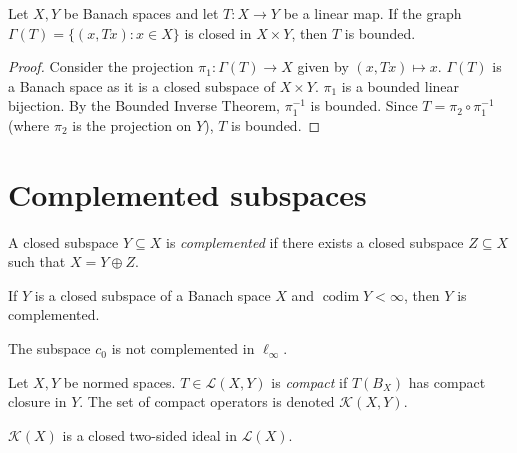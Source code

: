 \begin{theorem}
\label{theorem-closed-graph}
Let $X, Y$ be Banach spaces and let $T : X
\to Y$ be a linear map. If the graph
$\Gamma(T) = \{ (x, Tx) : x \in X \}$ is
closed in $X \times Y$, then $T$ is bounded.
\end{theorem}

\begin{proof}
Consider the projection $\pi_1 : \Gamma(T)
\to X$ given by $(x, Tx) \mapsto x$.
$\Gamma(T)$ is a Banach space as it is a
closed subspace of $X \times Y$. $\pi_1$ is a
bounded linear bijection. By the Bounded
Inverse Theorem, $\pi_1^{-1}$ is bounded.
Since $T = \pi_2 \circ \pi_1^{-1}$ (where
$\pi_2$ is the projection on $Y$), $T$ is
bounded.
\end{proof}

\section{Complemented subspaces}
\label{section-complemented-subspaces}

\begin{definition}
\label{definition-complemented-subspace}
A closed subspace $Y \subseteq X$ is {\it
complemented} if there exists a closed
subspace $Z \subseteq X$ such that $X = Y
\oplus Z$.
\end{definition}

\begin{proposition}
\label{proposition-finite-codim-complemented}
If $Y$ is a closed subspace of a Banach space
$X$ and $\operatorname{codim} Y < \infty$,
then $Y$ is complemented.
\end{proposition}

\begin{theorem}[Phillips]
\label{theorem-c0-not-complemented}
The subspace $c_0$ is not complemented in
$\ell_\infty$.
\end{theorem}


\begin{definition}
\label{definition-compact-operator}
Let $X, Y$ be normed spaces. $T \in \mathcal
L(X,Y)$ is {\it compact} if $T(B_X)$ has
compact closure in $Y$. The set of compact
operators is denoted $\mathcal K(X,Y)$.
\end{definition}

\begin{proposition}
\label{proposition-compact-operator-ideal}
$\mathcal K(X)$ is a closed two-sided ideal
in $\mathcal L(X)$.
\end{proposition}


